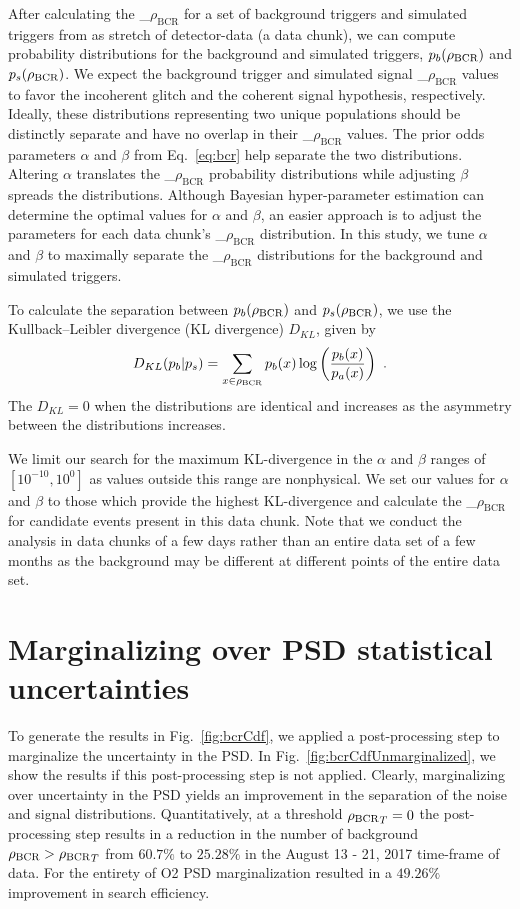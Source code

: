 \documentclass[%
 nofootinbib,
 amsmath,amssymb,
 aps,
 twocolumn
]{revtex4-2}
\newcommand{\mathcmd}[1]{{\sc \relax\ifmmode#1\else $#1$\fi}\xspace}
\newcommand{\bcr}{\mathcmd{\rho_\text{BCR}}}
\begin{document}
After calculating the \bcr for a set of background triggers and simulated triggers from as stretch of detector-data (a data chunk), we can compute probability distributions for the background and simulated triggers, $p_b(\bcr)$ and $p_s(\bcr)$. We expect the background trigger and simulated signal \bcr values to favor the incoherent glitch and the coherent signal hypothesis, respectively. Ideally, these distributions representing two unique populations should be distinctly separate and have no overlap in their \bcr values. The prior odds parameters $\alpha$ and $\beta$ from Eq.~\ref{eq:bcr} help separate the two distributions. Altering $\alpha$ translates the \bcr probability distributions while adjusting $\beta$ spreads the distributions. Although Bayesian hyper-parameter estimation can determine the optimal values for $\alpha$ and $\beta$, an easier approach is to adjust the parameters for each data chunk's \bcr distribution. In this study, we tune $\alpha$ and $\beta$ to maximally separate the \bcr distributions for the background and simulated triggers. 

To calculate the separation between $p_b(\bcr)$ and $p_s(\bcr)$, we use the Kullback--Leibler divergence (KL divergence) $D_{KL}$, given by
\begin{equation}
    D_{KL}(p_b | p_s) = \sum\limits_{x\in \bcr} p_b(x) \log \left( \frac{p_b(x)}{p_a(x)} \right)  \ .
\end{equation}
The $D_{KL}=0$ when the distributions are identical and increases as the asymmetry between the distributions increases. 

We limit our search for the maximum KL-divergence in the $\alpha$ and $\beta$ ranges of $[10^{-10}, 10^0]$ as values outside this range are nonphysical. We set our values for $\alpha$ and $\beta$ to those which provide the highest KL-divergence and calculate the \bcr for candidate events present in this data chunk. Note that we conduct the analysis in data chunks of a few days rather than an entire data set of a few months as the background may be different at different points of the entire data set.

\section{Marginalizing over PSD statistical uncertainties}\label{sec:psd-marginalization}
To generate the results in Fig.~\ref{fig:bcrCdf}, we applied a post-processing step to marginalize the uncertainty in the PSD. In Fig.~\ref{fig:bcrCdfUnmarginalized}, we show the results if this post-processing step is not applied. Clearly, marginalizing over uncertainty in the PSD yields an improvement in the separation of the noise and signal distributions. Quantitatively, at a threshold $\bcr_T=0$ the post-processing step results in a reduction in the number of background $\bcr > \bcr_T$ from $60.7\%$ to $25.28\%$ in the August 13 - 21, 2017 time-frame of data. For the entirety of O2 PSD marginalization resulted in a $49.26\%$ improvement in search efficiency. 
\end{document}

